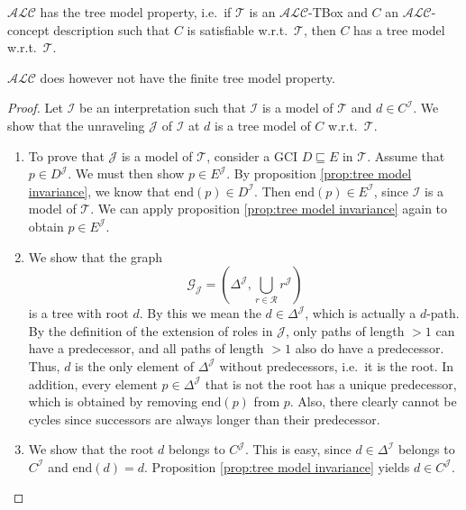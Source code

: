 \begin{theorem}\label{tree model property}
	$\mathcal{ALC}$ has the tree model property,
	i.e.\ if $\mathcal{T}$ is an $\mathcal{ALC}$-TBox and $C$ an $\mathcal{ALC}$-concept description
	such that $C$ is satisfiable w.r.t.\ $\mathcal{T}$, then $C$ has a tree model w.r.t.\ $\mathcal{T}$.
\end{theorem}
\begin{note}
	$\mathcal{ALC}$ does however not have the finite tree model property.
\end{note}
\begin{proof}
	Let $\mathcal{I}$ be an interpretation such that $\mathcal{I}$ is a model of $\mathcal{T}$ and $d \in C^{\mathcal{I}}$.
	We show that the unraveling $\mathcal{J}$ of $\mathcal{I}$ at $d$ is a tree model of $C$ w.r.t.\ $\mathcal{T}$.
	\begin{enumerate}
		\item To prove that $\mathcal{J}$ is a model of $\mathcal{T}$,
			consider a GCI $D \sqsubseteq E$ in $\mathcal{T}$.
			Assume that $p \in D^{\mathcal{J}}$.
			We must then show $p \in E^{\mathcal{J}}$.
			By proposition \ref{prop:tree model invariance},
			we know that $\text{end}(p) \in D^{\mathcal{I}}$.
			Then $\text{end}(p) \in E^{\mathcal{I}}$, since $\mathcal{I}$ is a model of $\mathcal{T}$.
			We can apply proposition \ref{prop:tree model invariance} again to obtain $p \in E^{\mathcal{J}}$.
		\item We show that  the graph
			\[
				\mathcal{G}_{\mathcal{J}} = \left( \Delta^{\mathcal{J}}, \bigcup_{r \in \mathscr{R}} r^{\mathcal{J}} \right)
			\]
			is a tree with root $d$.
			By this we mean the $d \in \Delta^{\mathcal{J}}$, which is actually a $d$-path.
			By the definition of the extension of roles in $\mathcal{J}$,
			only paths of length $> 1$ can have a predecessor,
			and all paths of length $> 1$ also do have a predecessor.
			Thus, $d$ is the only element of $\Delta^{\mathcal{J}}$ without predecessors,
			i.e.\ it is the root.
			In addition, every element $p \in \Delta^{\mathcal{J}}$ that is not the root has a unique predecessor,
			which is obtained by removing $\text{end}(p)$ from $p$.
			Also, there clearly cannot be cycles since successors are always longer than their predecessor.
		\item We show that the root $d$ belongs to $C^{\mathcal{J}}$.
			This is easy, since $d \in \Delta^{\mathcal{I}}$ belongs to $C^{\mathcal{I}}$ and $\text{end}(d)=d$.
			Proposition \ref{prop:tree model invariance} yields $d \in C^{\mathcal{J}}$. \qedhere
	\end{enumerate}
\end{proof}


